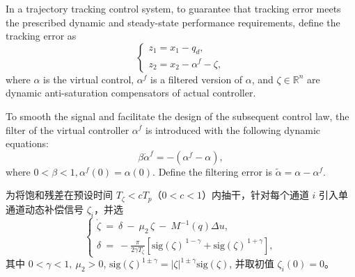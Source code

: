 \documentclass[pdflatex,sn-mathphys-num]{sn-jnl}%
\theoremstyle{thmstyleone}%
\theoremstyle{thmstyletwo}%
\theoremstyle{thmstylethree}%
\begin{document}
\par In a trajectory tracking control system, to  guarantee that tracking error meets the prescribed dynamic and steady-state performance requirements, define the tracking error as
\begin{equation}\label{eq:20}
	\begin{cases}
		z_{1} = x_{1} - q_{d}, \\
	  z_{2} = x_{2} -\alpha^{f}-\zeta,
	\end{cases}
	\end{equation}
	where $\alpha$ is the virtual control, $\alpha^{f}$ is a filtered version of ${\alpha}$, and $\zeta \in\mathbb{R}^{n}$ are dynamic anti-saturation compensators of actual controller.






 To smooth the signal and facilitate the design of the subsequent control law, the filter of the virtual controller $\alpha^{f}$ is introduced with the following dynamic equations:
\begin{equation}\label{eq:22}
	\beta \dot{\alpha}^{f}
	= -\left(\alpha^{f}-\alpha\right),	
\end{equation}
where $0<\beta<1, \alpha^{f}(0)=\alpha(0)$. Define the filtering error is
$\tilde{\alpha}= \alpha-\alpha^{f}$.


为将饱和残差在预设时间 $T_\zeta<cT_p$（$0<c<1$）内抽干，针对每个通道 $i$ 引入单通道动态补偿信号 $\zeta_{i}$，并选
\begin{equation}\label{eq:zeta2-pts}
	\begin{cases}
\dot\zeta \ =\ \delta\ -\ \mu_2\,\zeta\ -\ M^{-1}(q)\Delta u,\\
\delta\ =\ -\frac{\pi}{2\gamma T_\zeta}\left[\mathrm{sig}(\zeta)^{\,1-\gamma}+\mathrm{sig}(\zeta)^{\,1+\gamma}\right],
	\end{cases}
\end{equation}
其中 $0<\gamma<1,\ \mu_2>0$, $\mathrm{sig}(\zeta)^{1\pm \gamma}=|\zeta|^{1\pm \gamma}\mathrm{sig}(\zeta)$, 并取初值 $\zeta_{i}(0)=0$。



 
\end{document}
